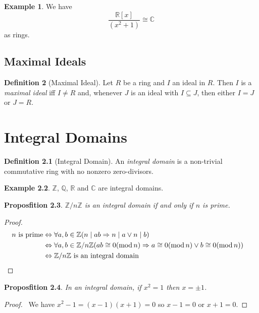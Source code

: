 \documentclass{book}
\let\qed\relax
\newtheorem{prop}{Proposfition}[chapter]
\theoremstyle{definition}
\newtheorem{df}[prop]{Definition}
\newtheorem{ex}[prop]{Example}
\renewcommand{\mod}{\ensuremath{\operatorname{mod}}}
\begin{document}
\begin{ex}
We have
\[ \frac{\mathbb{R}[x]}{(x^2 + 1)} \cong \mathbb{C} \]
as rings.
\end{ex}

\section{Maximal Ideals}

\begin{df}[Maximal Ideal]
Let $R$ be a ring and $I$ an ideal in $R$. Then $I$ is a \emph{maximal ideal} iff $I \neq R$ and, whenever $J$ is an ideal with $I \subseteq J$, then either $I = J$ or $J = R$.
\end{df}

\chapter{Integral Domains}

\begin{df}[Integral Domain]
An \emph{integral domain} is a non-trivial commutative ring with no nonzero zero-divisors.
\end{df}

\begin{ex}
$\mathbb{Z}$, $\mathbb{Q}$, $\mathbb{R}$ and $\mathbb{C}$ are integral domains.
\end{ex}

\begin{prop}
$\mathbb{Z} / n \mathbb{Z}$ is an integral domain if and only if $n$ is prime.
\end{prop}

\begin{proof}
\pf
\begin{align*}
n \text{ is prime} & \Leftrightarrow \forall a,b \in \mathbb{Z} (n \mid a b \Rightarrow n \mid a \vee n \mid b) \\
& \Leftrightarrow \forall a,b \in \mathbb{Z} / n \mathbb{Z} (ab \cong 0 (\mod n) \Rightarrow a \cong 0 (\mod n) \vee b \cong 0 (\mod n)) \\
& \Leftrightarrow \mathbb{Z} / n \mathbb{Z} \text{ is an integral domain} & \qed
\end{align*}
\end{proof}

\begin{prop}
In an integral domain, if $x^2 = 1$ then $x = \pm 1$.
\end{prop}

\begin{proof}
\pf\ We have $x^2 - 1 = (x-1)(x+1) = 0$ so $x-1 = 0$ or $x+1 = 0$. \qed
\end{proof}
\end{document}
